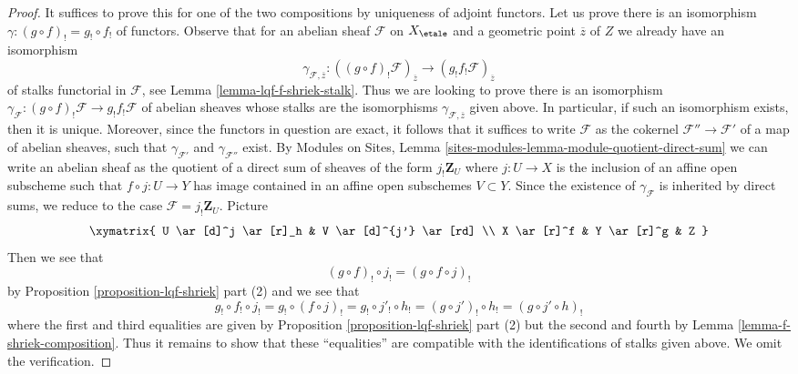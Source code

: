 \begin{proof}
It suffices to prove this for one of the two compositions by uniqueness
of adjoint functors. Let us prove there is an isomorphism
$\gamma : (g \circ f)_! = g_! \circ f_!$ of functors.
Observe that for an abelian sheaf $\mathcal{F}$ on $X_\etale$
and a geometric point $\overline{z}$ of $Z$ we already have an
isomorphism
$$
\gamma_{\mathcal{F}, \overline{z}} :
((g \circ f)_!\mathcal{F})_{\overline{z}}
\longrightarrow 
(g_!f_!\mathcal{F})_{\overline{z}}
$$
of stalks functorial in $\mathcal{F}$, see
Lemma \ref{lemma-lqf-f-shriek-stalk}.
Thus we are looking to prove there is an isomorphism
$\gamma_\mathcal{F} : (g \circ f)_!\mathcal{F} \to g_!f_!\mathcal{F}$
of abelian sheaves whose stalks are the isomorphisms
$\gamma_{\mathcal{F}, \overline{z}}$ given above. In particular, if
such an isomorphism exists, then it is unique.
Moreover, since the functors in question are exact,
it follows that it suffices to write $\mathcal{F}$ as the
cokernel $\mathcal{F}'' \to \mathcal{F}'$
of a map of abelian sheaves, such that $\gamma_{\mathcal{F}'}$
and $\gamma_{\mathcal{F}''}$ exist.
By  Modules on Sites, Lemma
\ref{sites-modules-lemma-module-quotient-direct-sum}
we can write an abelian sheaf as the quotient of a direct
sum of sheaves of the form $j_!\mathbf{Z}_U$
where $j : U \to X$ is the inclusion of an affine open subscheme
such that $f \circ j : U \to Y$ has image contained in an
affine open subschemes $V \subset Y$. Since the existence of
$\gamma_{\mathcal{F}}$ is inherited by direct sums, we
reduce to the case $\mathcal{F} = j_!\mathbf{Z}_U$.
Picture
$$
\xymatrix{
U \ar[d]^j \ar[r]_h &
V \ar[d]^{j'} \ar[rd] \\
X \ar[r]^f &
Y \ar[r]^g &
Z
}
$$
Then we see that
$$
(g \circ f)_! \circ j_! = (g \circ f \circ j)_!
$$
by Proposition \ref{proposition-lqf-shriek} part (2) and we see that
$$
g_! \circ f_! \circ j_! =
g_! \circ (f \circ j)_! =
g_! \circ j'_! \circ h_! =
(g \circ j')_! \circ h_! =
(g \circ j' \circ h)_!
$$
where the first and third equalities are given by
Proposition \ref{proposition-lqf-shriek} part (2)
but the second and fourth by Lemma \ref{lemma-f-shriek-composition}.
Thus it remains to show that these ``equalities'' are compatible
with the identifications of stalks given above. We omit the verification.
\end{proof}

